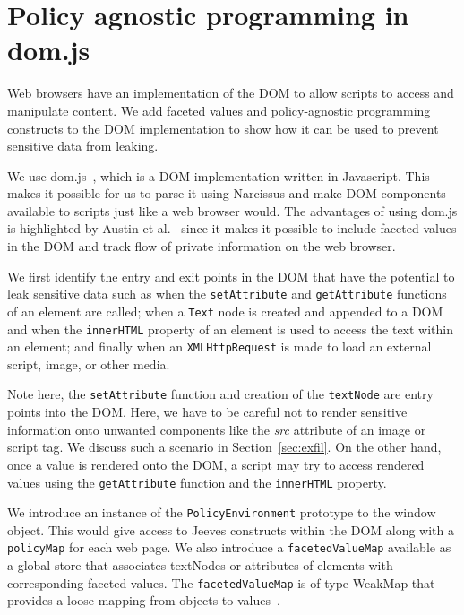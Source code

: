 \section{Policy agnostic programming in dom.js \label{sec:dom.js}}
Web browsers have an implementation of the DOM to allow scripts to
access and manipulate content. We add faceted values and policy-agnostic programming
constructs to the DOM implementation to show how it can be used to prevent
sensitive data from leaking.

We use dom.js~\cite{dom.js}, which is a DOM implementation written in Javascript.
This makes it possible for us to parse it using Narcissus and make DOM components
available to scripts just like a web browser would. The advantages of using dom.js
is highlighted by Austin et al.~\cite[Section 9.3]{TOPLAS} since it makes it possible
to include faceted values in the DOM and track flow of private information on the
web browser.

We first identify the entry and exit points in the DOM that have the potential
to leak sensitive data such as when the \texttt{setAttribute} and \texttt{getAttribute}
functions of an element are called; when a \texttt{Text} node is created
and appended to a DOM and when the \texttt{innerHTML} property of an element
is used to access the text within an element; and finally when an
\texttt{XMLHttpRequest} is made to load an external script, image, or other media.

Note here, the \texttt{setAttribute} function and creation of the \texttt{textNode}
are entry points into the DOM. Here, we have to be careful not to render sensitive
information onto unwanted components like the \textit{src} attribute of an image
or script tag. We discuss such a scenario in Section~\ref{sec:exfil}. On the
other hand, once a value is rendered onto the DOM, a script may try to access rendered
values using the \texttt{getAttribute} function and the \texttt{innerHTML} property.

We introduce an instance of the \texttt{PolicyEnvironment} prototype to the window
object. This would give access to Jeeves constructs within the DOM along with a
\texttt{policyMap} for each web page. We also introduce a \texttt{facetedValueMap}
available as a global store that associates textNodes or attributes of elements
with corresponding faceted values. The \texttt{facetedValueMap} is of
type WeakMap that provides a loose mapping from objects to values~\cite{WeakMap}.

